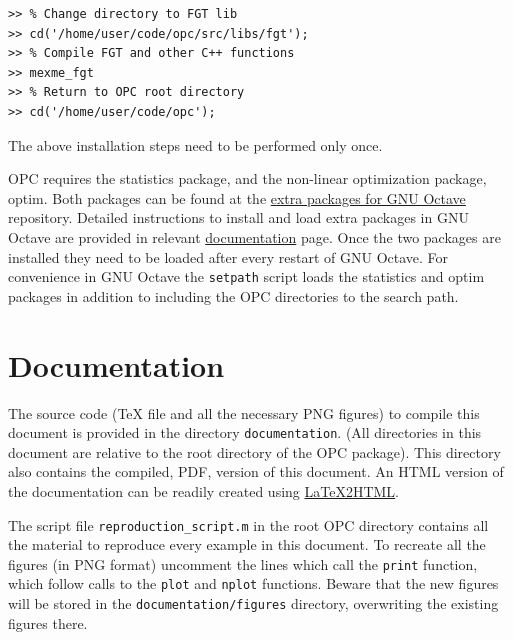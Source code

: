 \documentclass{book}
\begin{document}
\begin{verbatim}
>> % Change directory to FGT lib
>> cd('/home/user/code/opc/src/libs/fgt');
>> % Compile FGT and other C++ functions
>> mexme_fgt
>> % Return to OPC root directory
>> cd('/home/user/code/opc');
\end{verbatim}

\noindent
%
The above installation steps need to be performed only once.


OPC requires 
the statistics package, and the non-linear optimization package,
optim. 
%
Both packages can be found at the
\href{https://octave.sourceforge.io/packages.php}{extra packages for GNU
Octave} repository.
%
Detailed instructions to install and load extra packages in GNU Octave are provided
in relevant
\href{https://octave.org/doc/interpreter/Packages.html#Packages}{documentation}
page.
%
Once the two packages are installed they need to be loaded after every restart of
GNU Octave.
%
%
%
%
For convenience in GNU Octave the {\tt setpath} script loads the
statistics and optim packages in addition to including the OPC
directories to the search path.



\section{Documentation}


The source code ({\TeX} file and all the necessary PNG figures) to compile this document is
provided in the directory {\tt documentation}. (All directories in this
document are relative to the root directory of the OPC package). This
directory also contains the compiled, PDF, version of this document.
%
An HTML version of the documentation can be readily created using
\href{http://www.latex2html.org/}{LaTeX2HTML}.
%
%



The script file {\tt reproduction\_script.m} in the root OPC directory
contains all the material to reproduce every example in this
document. To recreate all the figures (in PNG format) uncomment the
lines which call the {\tt print} function, which follow 
calls to the 
{\tt plot} and {\tt nplot} functions. Beware that the new figures
will be stored in the {\tt documentation/figures} directory,
overwriting the existing figures there.
\end{document}

